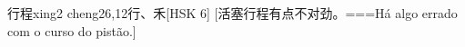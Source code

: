 \begin{EntryWithPhonetic}{行程}{xing2 cheng2}{6,12}{⾏、⽲}[HSK 6]
  [活塞行程有点不对劲。===Há algo errado com o curso do pistão.]
\end{EntryWithPhonetic}

